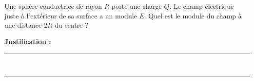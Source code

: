 Une sphère conductrice de rayon $R$ porte une charge $Q$. Le champ électrique juste à l'extérieur de sa surface a un module $E$. Quel est le module du champ à une distance $2R$ du centre ?

\choices

\noindent\textbf{Justification :} \hrulefill \\[2.5ex]
\rule{\linewidth}{0.4pt} \\[2.5ex]
\rule{\linewidth}{0.4pt}
\vfill
